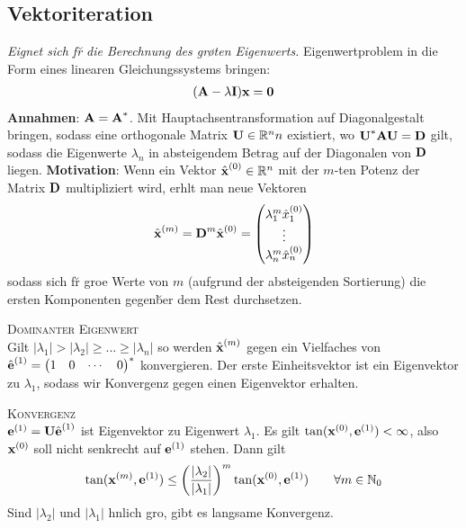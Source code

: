 \subsection{Vektoriteration}
\emph{Eignet sich f\u r die Berechnung des gr\o \s ten Eigenwerts.}
Eigenwertproblem in die Form eines linearen Gleichungssystems bringen:
\begin{align*}
(\mbox{\bf A} - \lambda \mbox{\bf I}) \mbox{\bf x} = \mbox{\bf 0}
\end{align*}
\textbf{Annahmen}:
$\mbox{\bf A} = \mbox{\bf A}^*$. Mit Hauptachsentransformation auf Diagonalgestalt bringen, sodass eine orthogonale Matrix $\mbox{\bf U} \in \mathbb{R}^{n}{n}$ existiert, wo $\mbox{\bf U}^*\mbox{\bf AU}=\mbox{\bf D}$ gilt, sodass die Eigenwerte $\lambda_n$ in absteigendem Betrag auf der Diagonalen von $\mbox{\bf D}$ liegen. 
\textbf{Motivation}: Wenn ein Vektor $\hat{\mbox{\bf x}}^{(0)} \in \mathbb{R}^{n}$ mit der $m$-ten Potenz der Matrix $\mbox{\bf D}$ multipliziert wird, erh\a lt man neue Vektoren \begin{align*}
\hat{\mbox{\bf x}}^{(m)} = \mbox{\bf D}^m \hat{\mbox{\bf x}}^{(0)} = \begin{pmatrix}
\lambda_1^m \hat{x}_1^{(0)}\\
\vdots \\
\lambda_n^m \hat{x}_n^{(0)}
\end{pmatrix}
\end{align*}
sodass sich f\u r gro\s e Werte von $m$ (aufgrund der absteigenden Sortierung) die ersten Komponenten gegen\u ber dem Rest durchsetzen. \vspace{0.2cm}

\textsc{Dominanter Eigenwert}\\
Gilt $|\lambda_1| > |\lambda_2| \geq ... \geq |\lambda_n|$ so werden $\hat{\mbox{\bf x}}^{(m)}$ gegen ein Vielfaches von $\hat{\mbox{\bf e}}^{(1)} = \begin{pmatrix}
1 & 0 & \cdots & 0
\end{pmatrix}^*$
konvergieren. Der erste Einheitsvektor ist ein Eigenvektor zu $\lambda_1$, sodass wir Konvergenz gegen einen Eigenvektor erhalten. \vspace{0.2cm}

\textsc{Konvergenz}\\
$\mbox{\bf e}^{(1)} = \mbox{\bf U}\hat{\mbox{\bf e}}^{(1)}$ ist Eigenvektor zu Eigenwert $\lambda_1$. Es gilt $\tan(\mbox{\bf x}^{(0)}, \mbox{\bf e}^{(1)}) < \infty$, also $\mbox{\bf x}^{(0)}$ soll nicht senkrecht auf $\mbox{\bf e}^{(1)}$ stehen. Dann gilt 
\begin{align*}
\tan(\mbox{\bf x}^{(m)}, \mbox{\bf e}^{(1)}) \leq \left(\frac{|\lambda_2|}{|\lambda_1|}\right)^m \tan(\mbox{\bf x}^{(0)}, \mbox{\bf e}^{(1)}) \qquad \forall m \in \mathbb{N}_0
\end{align*}
Sind $|\lambda_2|$ und $|\lambda_1|$ \a hnlich gro\s  , gibt es langsame Konvergenz.

